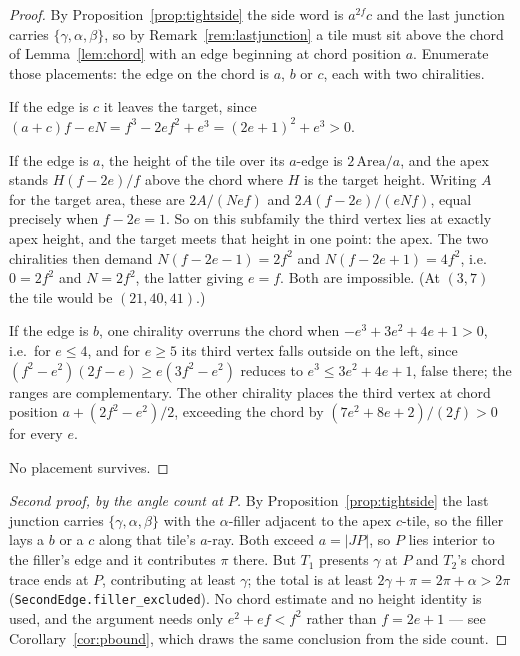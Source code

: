 \documentclass[11pt,reqno]{amsart}
\theoremstyle{plain}
\theoremstyle{definition}
\begin{document}
\begin{proof}
By Proposition~\ref{prop:tightside} the side word is $a^{2f}c$ and the last junction carries
$\{\gamma,\alpha,\beta\}$, so by Remark~\ref{rem:lastjunction} a tile must sit above the chord of
Lemma~\ref{lem:chord} with an edge beginning at chord position $a$. Enumerate those placements: the
edge on the chord is $a$, $b$ or $c$, each with two chiralities.

If the edge is $c$ it leaves the target, since $(a+c)f-eN=f^3-2ef^2+e^3=(2e+1)^2+e^3>0$.

If the edge is $a$, the height of the tile over its $a$-edge is $2\,\mathrm{Area}/a$, and the apex
stands $H(f-2e)/f$ above the chord where $H$ is the target height. Writing $A$ for the target area,
these are $2A/(Nef)$ and $2A(f-2e)/(eNf)$, equal precisely when $f-2e=1$. So on this subfamily the
third vertex lies at exactly apex height, and the target meets that height in one point: the apex.
The two chiralities then demand $N(f-2e-1)=2f^2$ and $N(f-2e+1)=4f^2$, i.e.\ $0=2f^2$ and $N=2f^2$,
the latter giving $e=f$. Both are impossible. \textup{(}At $(3,7)$ the tile would be $(21,40,41)$.\textup{)}

If the edge is $b$, one chirality overruns the chord when $-e^3+3e^2+4e+1>0$, i.e.\ for $e\le4$, and
for $e\ge5$ its third vertex falls outside on the left, since $(f^2-e^2)(2f-e)\ge e(3f^2-e^2)$
reduces to $e^3\le3e^2+4e+1$, false there; the ranges are complementary. The other chirality places
the third vertex at chord position $a+(2f^2-e^2)/2$, exceeding the chord by $(7e^2+8e+2)/(2f)>0$ for
every $e$.

No placement survives.
\end{proof}

\begin{proof}[Second proof, by the angle count at $P$]
By Proposition~\ref{prop:tightside} the last junction carries $\{\gamma,\alpha,\beta\}$ with the
$\alpha$-filler adjacent to the apex $c$-tile, so the filler lays a $b$ or a $c$ along that tile's
$a$-ray. Both exceed $a=|JP|$, so $P$ lies interior to the filler's edge and it contributes $\pi$
there. But $T_1$ presents $\gamma$ at $P$ and $T_2$'s chord trace ends at $P$, contributing at least
$\gamma$; the total is at least $2\gamma+\pi=2\pi+\alpha>2\pi$
(\texttt{SecondEdge.filler\_excluded}). No chord estimate and no height identity is used, and the
argument needs only $e^{2}+ef<f^{2}$ rather than $f=2e+1$ --- see Corollary~\ref{cor:pbound}, which
draws the same conclusion from the side count.
\end{proof}
\end{document}
